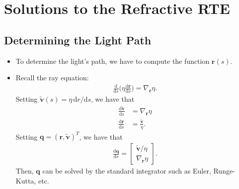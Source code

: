 \documentclass[10pt]{article}
\newcommand{\dee}{\mathrm{d}}
\newcommand{\ve}[1]{\mathbf{#1}}
\begin{document}
  \section{Solutions to the Refractive RTE}  
  \subsection{Determining the Light Path}
  \begin{itemize}
    \item To determine the light's path, we have to compute the function $\ve{r}(s)$.

    \item Recall the ray equation:
    \begin{align*}
      \frac{\dee }{\dee s}\bigg( \eta \frac{\dee \ve{r}}{\dee s}\bigg) = \nabla_{\ve{r}} \eta.
    \end{align*}
    Setting $\tilde{\ve{v}}(s) = \eta\, \dee{r}/\dee s$, we have that
    \begin{align*}
      \frac{\dee \tilde{\ve{v}}}{\dee s} &= \nabla_{\ve{r}}\eta\\
      \frac{\dee \ve{r}}{\dee s} &= \frac{ \tilde{\ve{v}} }{\eta}.
    \end{align*}
    Setting $\ve{q} = (\ve{r},\tilde{\ve{v}})^T$, we have that
    \begin{align*}
      \frac{\dee \ve{q} }{\dee s} = \begin{bmatrix}
        \tilde{\ve{v}} / \eta \\
        \nabla_{\ve{r}}\eta
      \end{bmatrix}.
    \end{align*}
    Then, $\ve{q}$ can be solved by the standard integrator such as Euler, Runge-Kutta, etc.
  \end{itemize}
\end{document}
